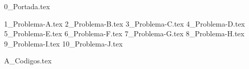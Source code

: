 \documentclass[a4paper,12pt,twoside]{all-in-one} %
\begin{document}

{0_Portada.tex}
{
  \hypersetup{hidelinks}
  \tableofcontents
}
\clearpage

{1_Problema-A.tex}
\clearpage
{2_Problema-B.tex}
\clearpage
{3_Problema-C.tex}
\clearpage
{4_Problema-D.tex}
\clearpage
{5_Problema-E.tex}
\clearpage
{6_Problema-F.tex}
\clearpage
{7_Problema-G.tex}
\clearpage
{8_Problema-H.tex}
\clearpage
{9_Problema-I.tex}
\clearpage
{10_Problema-J.tex}
\clearpage

\clearpage
\appendix
{A_Codigos.tex}

\clearpage
\pagestyle{\auxsettings}
\printbibliography[heading=bibintoc]
\end{document}
